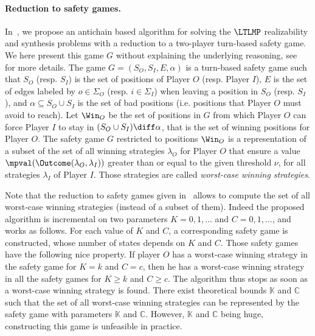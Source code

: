 \paragraph{Reduction to safety games.} In~\cite{DBLP:journals/corr/abs-1210-3539,DBLP:conf/tacas/BohyBFR13}, we propose an antichain based algorithm for solving the $\LTLMP$ realizability and synthesis problems with a reduction to a two-player turn-based safety game. We here present this game $G$ without explaining the underlying reasoning, see~\cite{DBLP:journals/corr/abs-1210-3539} for more details. The game $G = (S_O, S_I, E, \alpha)$ is a turn-based safety game such that $S_O$ (resp. $S_I$) is the set of positions of Player $O$ (resp. Player $I$), $E$ is the set of edges labeled by $o \in \Sigma_O$ (resp. $i \in \Sigma_I$) when leaving a position in $S_O$ (resp. $S_I$), and $\alpha \subseteq S_O \cup S_I$ is the set of bad positions (i.e. positions that Player $O$ must avoid to reach). Let $\Win_O$ be the set of positions in $G$ from which Player $O$ can force Player $I$ to stay in $(S_O\cup S_I)\diff\alpha$, that is the set of winning positions for Player $O$. The safety game $G$ restricted to positions $\Win_O$ is a representation of a subset of the set of all winning strategies $\lambda_O$ for Player $O$ that ensure a value $\mpval(\Outcome(\lambda_O,\lambda_I))$ greater than or equal to the given threshold $\nu$, for all strategies $\lambda_I$ of Player $I$. Those strategies are called \textit{worst-case winning strategies}. 

Note that the reduction to safety games given in~\cite{DBLP:journals/corr/abs-1210-3539,DBLP:conf/tacas/BohyBFR13} allows to compute the set of all worst-case winning strategies (instead of a subset of them). 
Indeed the proposed algorithm is incremental on two parameters $K = 0, 1, \dots$ and $C= 0, 1, \dots$, and works as follows. For each value of $K$ and $C$, a corresponding safety game is constructed, whose number of states depends on $K$ and $C$. Those safety games have the following nice property. If player $O$ has a worst-case winning strategy in the safety game for $K = k$ and $C = c$, then he has a worst-case winning strategy in all the safety games for $K \geq k$ and $C \geq c$. The algorithm thus stops as soon as a worst-case winning strategy is found. There exist theoretical bounds $\mathbb{K}$ and $\mathbb{C}$ such that the set of all worst-case winning strategies can be represented by the safety game with parameters $\mathbb{K}$ and $\mathbb{C}$. However, $\mathbb{K}$ and $\mathbb{C}$ being huge, constructing this game is unfeasible in practice. 


